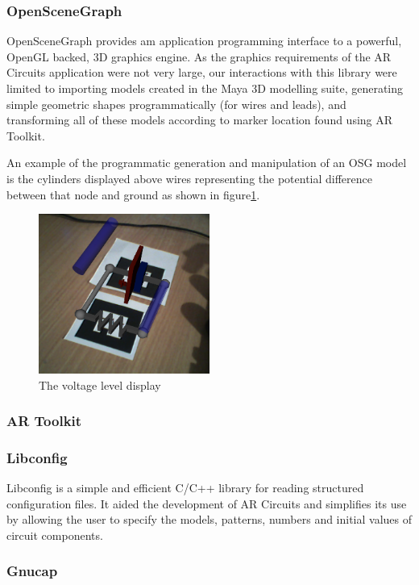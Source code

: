 \subsubsection{OpenSceneGraph}
OpenSceneGraph provides am application programming interface to a powerful,
OpenGL backed, 3D graphics engine. As the graphics requirements of the AR
Circuits application were not very large, our interactions with this
library were limited to importing models created in the Maya 3D modelling suite,
generating simple geometric shapes programmatically (for wires and leads), and
transforming all of these models according to marker location found using AR
Toolkit.

An example of the programmatic generation and manipulation of an OSG model is
the cylinders displayed above wires representing the potential difference
between that node and ground as shown in figure\ref{voltage}.
\begin{figure}
\begin{center}
\includegraphics[width=0.50\textwidth]{voltages}
\end{center}
\caption{The voltage level display}
\label{voltage}
\end{figure}


\subsubsection{AR Toolkit}


\subsubsection{Libconfig}
Libconfig is a simple and efficient C/C++ library for reading structured
configuration files. It aided the development of AR Circuits and simplifies its
use by allowing the user to specify the models, patterns, numbers and initial
values of circuit components.

\subsubsection{Gnucap}

